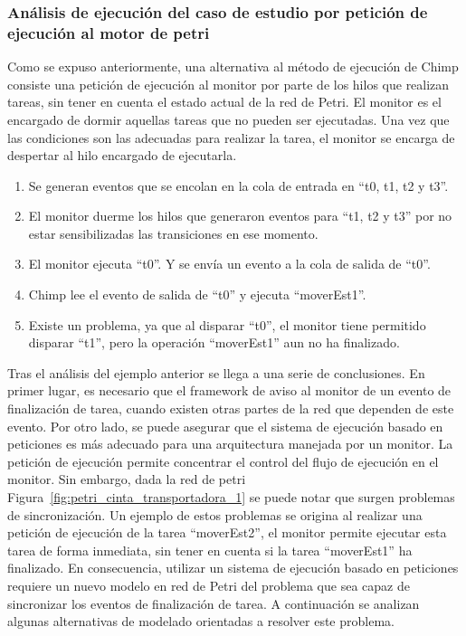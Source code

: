\subsubsection{Análisis de ejecución del caso de estudio por
petición de ejecución al motor de petri} 
Como se expuso anteriormente, una alternativa al método de ejecución de Chimp
consiste una petición de ejecución al monitor por parte de los hilos que
realizan tareas, sin tener en cuenta el estado actual de la red de Petri.
 El monitor es el encargado de dormir aquellas tareas que no pueden ser
 ejecutadas. Una vez que las condiciones son las adecuadas para realizar la
 tarea, el monitor se encarga de despertar al hilo encargado de ejecutarla.
\begin{enumerate}
    \item Se generan eventos que se encolan en la cola de entrada en “t0, t1,
    	t2 y t3”.
    \item El monitor duerme los hilos que generaron eventos para “t1, t2 y t3”
    	por no estar sensibilizadas las transiciones en ese momento.
    \item El monitor ejecuta “t0”. Y se envía un evento a la cola de salida de
    	“t0”.
    \item Chimp lee el evento de salida de “t0” y ejecuta “moverEst1”.
    \item Existe un problema, ya que al disparar “t0”, el monitor tiene
    	permitido disparar “t1”, pero la operación “moverEst1” aun no ha
    	finalizado.
\end{enumerate}
Tras el análisis  del ejemplo anterior se llega a una serie de
conclusiones. En primer lugar, es necesario que el framework de aviso al monitor
de un evento de finalización de tarea, cuando existen otras partes de la red que
dependen de este evento.
Por otro lado, se puede asegurar que el sistema de ejecución basado en
peticiones es más adecuado para una arquitectura manejada por un monitor. La
petición de ejecución permite concentrar el control del flujo de ejecución en
el monitor.
Sin embargo, dada la red de petri
Figura~\ref{fig:petri_cinta_transportadora_1} se puede notar que surgen
problemas de sincronización. Un ejemplo de estos problemas se origina al realizar una petición de ejecución de la tarea “moverEst2”, el monitor permite ejecutar esta
tarea de forma inmediata, sin tener en cuenta si la tarea ``moverEst1'' ha
finalizado. En consecuencia, utilizar un sistema de ejecución basado en
peticiones requiere un nuevo modelo en red de Petri del problema que sea capaz
de sincronizar los eventos de finalización de tarea.
A continuación se analizan algunas alternativas de modelado orientadas a
resolver este problema.

